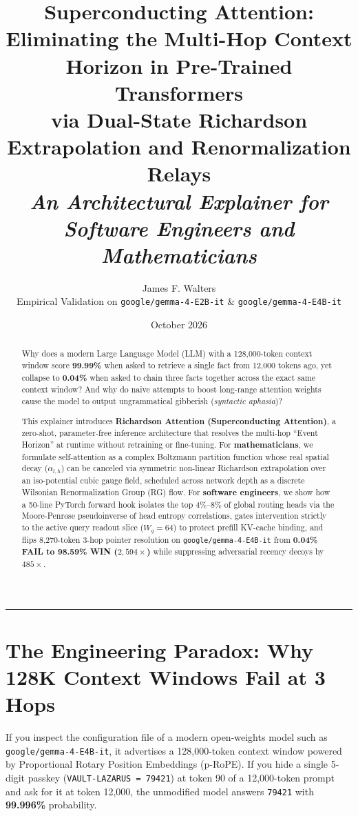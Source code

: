 \documentclass[11pt,letterpaper]{article}
\title{\textbf{Superconducting Attention:\\
Eliminating the Multi-Hop Context Horizon in Pre-Trained Transformers\\
via Dual-State Richardson Extrapolation and Renormalization Relays}\\
\vspace{0.4em}
\large \textit{An Architectural Explainer for Software Engineers and Mathematicians}}
\author{James F. Walters\\
\small Empirical Validation on \texttt{google/gemma-4-E2B-it} \& \texttt{google/gemma-4-E4B-it}}
\date{October 2026}
\begin{document}
\maketitle

\begin{abstract}
\noindent
Why does a modern Large Language Model (LLM) with a 128,000-token context window score \textbf{99.99\%} when asked to retrieve a single fact from 12,000 tokens ago, yet collapse to \textbf{0.04\%} when asked to chain three facts together across the exact same context window? And why do naive attempts to boost long-range attention weights cause the model to output ungrammatical gibberish (\emph{syntactic aphasia})?

This explainer introduces \textbf{Richardson Attention (Superconducting Attention)}, a zero-shot, parameter-free inference architecture that resolves the multi-hop ``Event Horizon'' at runtime without retraining or fine-tuning. For \textbf{mathematicians}, we formulate self-attention as a complex Boltzmann partition function whose real spatial decay ($\alpha_{l,h}$) can be canceled via symmetric non-linear Richardson extrapolation over an iso-potential cubic gauge field, scheduled across network depth as a discrete Wilsonian Renormalization Group (RG) flow. For \textbf{software engineers}, we show how a 50-line PyTorch forward hook isolates the top $4\%\text{--}8\%$ of global routing heads via the Moore-Penrose pseudoinverse of head entropy correlations, gates intervention strictly to the active query readout slice ($W_q = 64$) to protect prefill KV-cache binding, and flips 8,270-token 3-hop pointer resolution on \texttt{google/gemma-4-E4B-it} from \textbf{0.04\% FAIL to 98.59\% WIN ($2,594\times$)} while suppressing adversarial recency decoys by \textbf{$485\times$}.
\end{abstract}

\vspace{0.5em}
\hrule
\vspace{1em}

\section{The Engineering Paradox: Why 128K Context Windows Fail at 3 Hops}

If you inspect the configuration file of a modern open-weights model such as \texttt{google/gemma-4-E4B-it}, it advertises a 128,000-token context window powered by Proportional Rotary Position Embeddings (p-RoPE). If you hide a single 5-digit passkey (\texttt{VAULT-LAZARUS = 79421}) at token 90 of a 12,000-token prompt and ask for it at token 12,000, the unmodified model answers \texttt{79421} with \textbf{99.996\%} probability.
\end{document}
